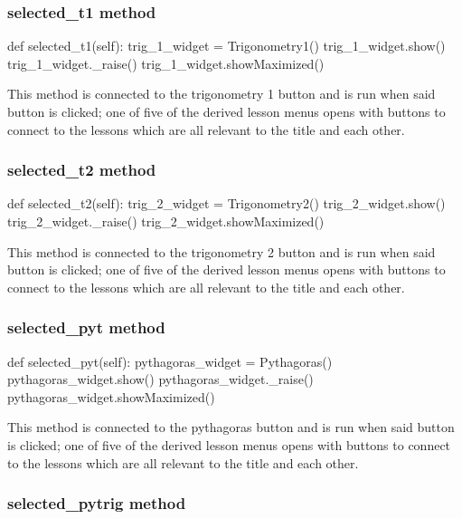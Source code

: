 \subsubsection{selected\_t1 method}

\begin{python}
def selected_t1(self):
        trig_1_widget = Trigonometry1()
        trig_1_widget.show()
        trig_1_widget._raise()
        trig_1_widget.showMaximized()
\end{python}

This method is connected to the trigonometry 1 button and is run when said button is clicked; one of five of the derived lesson menus opens with buttons to connect to the lessons which are all relevant to the title and each other.

\subsubsection{selected\_t2 method}

\begin{python}
def selected_t2(self):
        trig_2_widget = Trigonometry2()
        trig_2_widget.show()
        trig_2_widget._raise()
        trig_2_widget.showMaximized()
\end{python}

This method is connected to the trigonometry 2 button and is run when said button is clicked; one of five of the derived lesson menus opens with buttons to connect to the lessons which are all relevant to the title and each other.

\subsubsection{selected\_pyt method}

\begin{python}
def selected_pyt(self):
        pythagoras_widget = Pythagoras()
        pythagoras_widget.show()
        pythagoras_widget._raise()
        pythagoras_widget.showMaximized()
\end{python}

This method is connected to the pythagoras button and is run when said button is clicked; one of five of the derived lesson menus opens with buttons to connect to the lessons which are all relevant to the title and each other.

\subsubsection{selected\_pytrig method}

